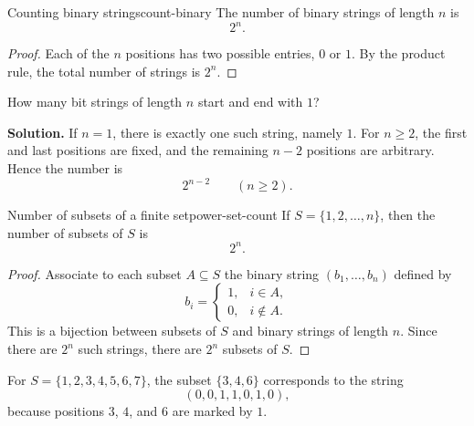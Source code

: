 \begin{theorem}{Counting binary strings}{count-binary}
The number of binary strings of length $n$ is
\[
2^n.
\]
\end{theorem}

\begin{proof}
Each of the $n$ positions has two possible entries, $0$ or $1$. By the product rule, the total number of strings is $2^n$.
\end{proof}

\begin{examplebox}[title={Tutorial 1, Question 2(b)}]
How many bit strings of length $n$ start and end with $1$?

\textbf{Solution.}
If $n=1$, there is exactly one such string, namely $1$.
For $n\ge 2$, the first and last positions are fixed, and the remaining $n-2$ positions are arbitrary. Hence the number is
\[
2^{n-2}\qquad (n\ge 2).
\]
\end{examplebox}

\begin{theorem}{Number of subsets of a finite set}{power-set-count}
If $S=\{1,2,\dots,n\}$, then the number of subsets of $S$ is
\[
2^n.
\]
\end{theorem}

\begin{proof}
Associate to each subset $A\subseteq S$ the binary string $(b_1,\dots,b_n)$ defined by
\[
b_i=
\begin{cases}
1,& i\in A,\\
0,& i\notin A.
\end{cases}
\]
This is a bijection between subsets of $S$ and binary strings of length $n$. Since there are $2^n$ such strings, there are $2^n$ subsets of $S$.
\end{proof}

\begin{center}
\end{center}

\begin{examplebox}[title={The standard subset encoding}]
For $S=\{1,2,3,4,5,6,7\}$, the subset $\{3,4,6\}$ corresponds to the string
\[
(0,0,1,1,0,1,0),
\]
because positions $3$, $4$, and $6$ are marked by $1$.
\end{examplebox}


